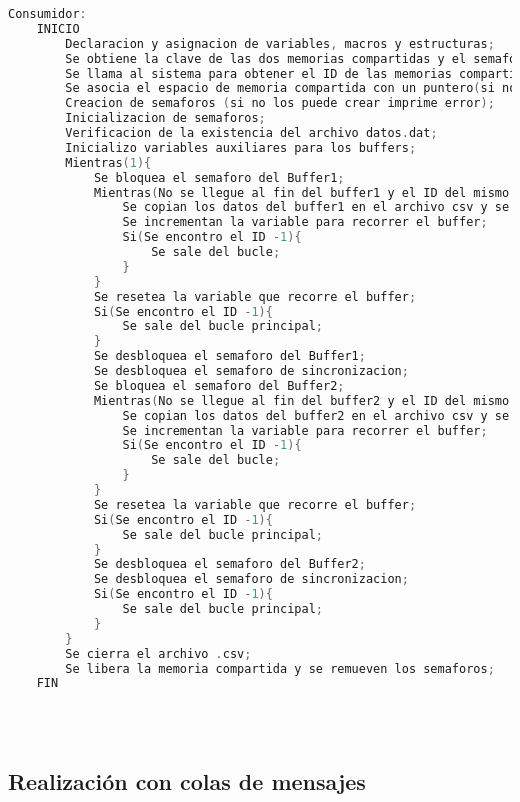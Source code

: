 \begin{lstlisting}[language=C]
    Consumidor:
    INICIO
        Declaracion y asignacion de variables, macros y estructuras;
        Se obtiene la clave de las dos memorias compartidas y el semaforo (en el caso de que no las obtenga imprime error);
        Se llama al sistema para obtener el ID de las memorias compartidas (en el caso de que no las obtenga imprime error);
        Se asocia el espacio de memoria compartida con un puntero(si no puede asociar imprime error);
        Creacion de semaforos (si no los puede crear imprime error);
        Inicializacion de semaforos;
        Verificacion de la existencia del archivo datos.dat;
        Inicializo variables auxiliares para los buffers;
        Mientras(1){
	        Se bloquea el semaforo del Buffer1;
	        Mientras(No se llegue al fin del buffer1 y el ID del mismo no sea -1){
		        Se copian los datos del buffer1 en el archivo csv y se imprimen en pantalla;
		        Se incrementan la variable para recorrer el buffer;
		        Si(Se encontro el ID -1){
			        Se sale del bucle;
                }
	        }
	        Se resetea la variable que recorre el buffer;
	        Si(Se encontro el ID -1){
	            Se sale del bucle principal;
            }
            Se desbloquea el semaforo del Buffer1;
            Se desbloquea el semaforo de sincronizacion;
            Se bloquea el semaforo del Buffer2;
		    Mientras(No se llegue al fin del buffer2 y el ID del mismo no sea -1){
		        Se copian los datos del buffer2 en el archivo csv y se imprimen en pantalla;
		        Se incrementan la variable para recorrer el buffer;
		        Si(Se encontro el ID -1){
			        Se sale del bucle;
                }
	        }
	        Se resetea la variable que recorre el buffer;
	        Si(Se encontro el ID -1){
	            Se sale del bucle principal;
            }
            Se desbloquea el semaforo del Buffer2;
            Se desbloquea el semaforo de sincronizacion;
            Si(Se encontro el ID -1){
	            Se sale del bucle principal;
            }
        }
        Se cierra el archivo .csv;
        Se libera la memoria compartida y se remueven los semaforos;
    FIN

    
    
\end{lstlisting}

\subsection{Realización con colas de mensajes}

